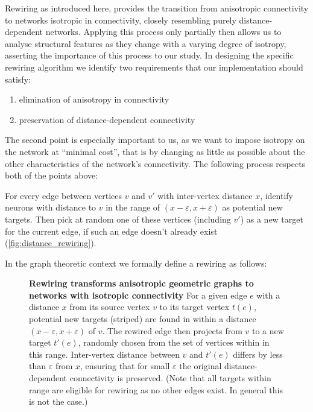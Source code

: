 Rewiring as introduced here, provides the transition from anisotropic
connectivity to networks isotropic in connectivity, closely resembling
purely distance-dependent networks. Applying this process only
partially then allows us to analyse structural features as they change with
a varying degree of isotropy, asserting the importance of this process
to our study. In designing the specific rewiring algorithm we identify
two requirements that our implementation should satisfy: 
\begin{enumerate}
  \itemsep-11pt
  \item elimination of anisotropy in connectivity 
  \item preservation of distance-dependent connectivity
\end{enumerate}
The second point is especially important to us, as we want to impose
isotropy on the network at \enquote{minimal cost}, that is by changing
as little as possible about the other characteristics of the network's
connectivity. The following process respects both of the points above:
\begin{blockquote}{
For every edge between vertices $v$ and $v'$ with inter-vertex
distance $x$, identify neurons with distance to $v$ in the range of
$(x-\varepsilon, x+\varepsilon)$ as potential new targets. Then pick
at random one of these vertices (including $v'$) as a new target for
the current edge, if such an edge doesn't already exist
(\autoref{fig:distance_rewiring}).}
\end{blockquote}
In the graph theoretic context we
formally define a rewiring as follows:

\vspace{0.2cm}
\begin{figure}[H]
  \centering 
  \caption{\textbf{Rewiring transforms anisotropic geometric graphs to
      networks with isotropic connectivity} For a given edge $e$ with
    a distance $x$ from its source vertex $v$ to its target vertex
    $t(e)$, potential new targets (striped) are found in within a
    distance $(x-\varepsilon, x+\varepsilon)$ of $v$. The rewired edge
    then projects from $v$ to a new target $t'(e)$, randomly chosen
    from the set of vertices within in this range. Inter-vertex
    distance between $v$ and $t'(e)$ differs by less than
    $\varepsilon$ from $x$, ensuring that for small $\varepsilon$ the
    original distance-dependent connectivity is preserved. (Note that
    all targets within range are eligible for rewiring as no other
    edges exist. In general this is not the case.)}
  \label{fig:distance_rewiring}
\end{figure}



